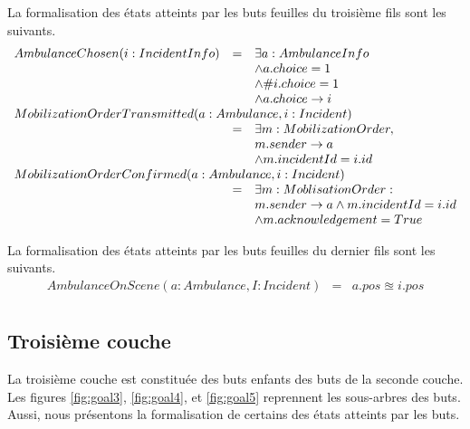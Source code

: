 	La formalisation des états atteints par les buts feuilles du troisième fils sont
	les suivants.
	\singlespacing
	\begin{equation*}
		\begin{array}{rcl}
			AmbulanceChosen(i:IncidentInfo)  
			& = & \exists a:AmbulanceInfo \\
			&   & \wedge a.choice = 1 \\
			&   & \wedge \#i.choice = 1 \\
			&   & \wedge a.choice \rightarrow i \\
			
			\multicolumn{3}{l}{MobilizationOrderTransmitted(a: Ambulance, i:Incident)} \\ 
			& = & \exists m: MobilizationOrder, \\
			&   & m.sender \rightarrow a \\
			&   & \wedge  m.incidentId = i.id \\
			
			\multicolumn{3}{l}{MobilizationOrderConfirmed(a:Ambulance, i:Incident)} \\ 
			& = & \exists m:MoblisationOrder: \\
			&   & m.sender \rightarrow a \wedge m.incidentId = i.id \\ 
			&   & \wedge m.acknowledgement = True \\
		\end{array}
	\end{equation*}
	\onehalfspacing
	
	La formalisation des états atteints par les buts feuilles du dernier fils sont
	les suivants.		
	\singlespacing
	\begin{equation*}
		\begin{array}{rcl}
			AmbulanceOnScene(a:Ambulance, I:Incident)
			& = & a.pos \approxeq i.pos \\ 
		\end{array}
	\end{equation*}
	\onehalfspacing


\subsection{Troisième couche}

	La troisième couche est constituée des buts enfants
	des buts de la seconde couche. Les figures \ref{fig:goal3}, \ref{fig:goal4},
	et \ref{fig:goal5} reprennent les sous-arbres des buts. Aussi, nous
	présentons la formalisation de certains des états atteints par les
	buts.


